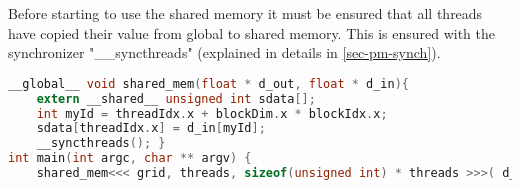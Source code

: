 Before starting to use the shared memory it must be ensured that all threads have copied their value from global to shared memory.
This is ensured with the synchronizer "\_\_syncthreads" (explained in details in \autoref{sec-pm-synch}).
\begin{lstlisting}[language=C,caption={Kernel example},label=lst:shared-mem-acc]
__global__ void shared_mem(float * d_out, float * d_in){
	extern __shared__ unsigned int sdata[];
	int myId = threadIdx.x + blockDim.x * blockIdx.x;
	sdata[threadIdx.x] = d_in[myId];
	__syncthreads(); }
int main(int argc, char ** argv) {
	shared_mem<<< grid, threads, sizeof(unsigned int) * threads >>>( d_in, d_out ); }
\end{lstlisting}

